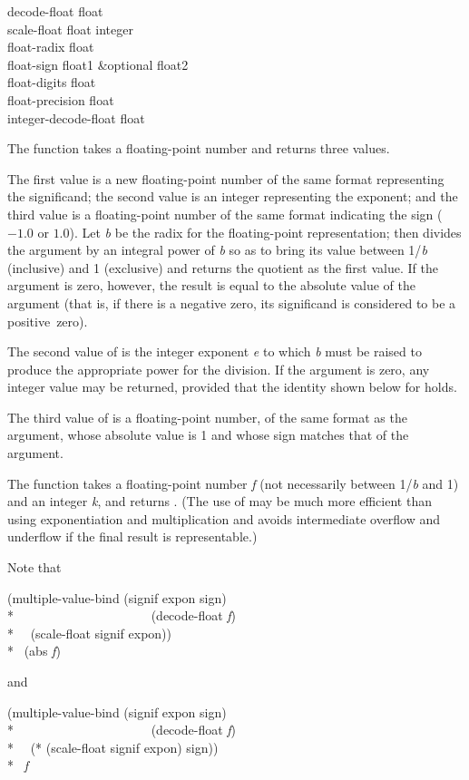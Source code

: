 \begin{defun}[Function]
decode-float float \\
scale-float float integer \\
float-radix float \\
float-sign float1 &optional float2 \\
float-digits float \\
float-precision float \\
integer-decode-float float

The function  takes a floating-point number
and returns three values.

The first value is a new floating-point number of the same format
representing the significand; the second value is an integer
representing the exponent; and the third value is a floating-point
number of the same format indicating the sign ($-1.0$ or $1.0$).
Let \emph{b} be the radix for the floating-point representation;
then  divides the argument by an integral power of \emph{b}
so as to bring its value between 1/\emph{b} (inclusive) and 1 (exclusive)
and returns the quotient as the first value.
If the argument is zero, however, the result
is equal to the absolute value of the argument (that is, if there is a negative
zero, its significand is considered to be a positive~zero).

The second value of  is
the integer exponent \emph{e} to which \emph{b} must be raised
to produce the appropriate power for the division.
If the argument is zero, any integer value may be returned, provided
that the identity shown below for  holds.

The third value of  is a floating-point number,
of the same format as the argument, whose absolute value is 1
and whose sign matches that of the argument.

The function  takes a floating-point number \emph{f}
(not necessarily between 1/\emph{b} and 1) and
an integer \emph{k}, and returns .
(The use of  may be much more efficient than using
exponentiation and multiplication and avoids intermediate
overflow and underflow if the final result is representable.)

Note that
\begin{lisp}
(multiple-value-bind (signif expon sign) \\*
~~~~~~~~~~~~~~~~~~~~~(decode-float \emph{f}) \\*
~~(scale-float signif expon)) \\*
\EQ\ (abs \emph{f})
\end{lisp}
and
\begin{lisp}
(multiple-value-bind (signif expon sign) \\*
~~~~~~~~~~~~~~~~~~~~~(decode-float \emph{f}) \\*
~~(* (scale-float signif expon) sign)) \\*
\EQ\ \emph{f}
\end{lisp}


\end{defun}
